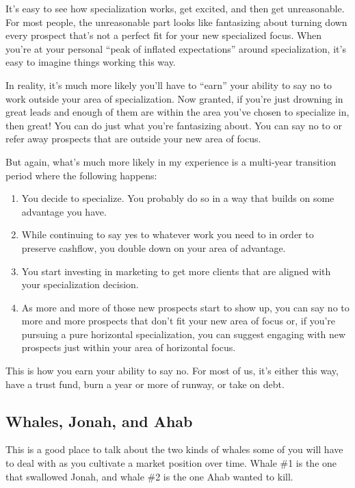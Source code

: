 It's easy to see how specialization works, get excited, and then get unreasonable. For most people, the unreasonable part looks like fantasizing about turning down every prospect that's not a perfect fit for your new specialized focus. When you're at your personal ``peak of inflated expectations'' around specialization, it's easy to imagine things working this way.

In reality, it's much more likely you'll have to ``earn'' your ability to say no to work outside your area of specialization. Now granted, if you're just drowning in great leads and enough of them are within the area you've chosen to specialize in, then great! You can do just what you're fantasizing about. You can say no to or refer away prospects that are outside your new area of focus.

But again, what's much more likely in my experience is a multi-year transition period where the following happens:

\begin{enumerate}
\item You decide to specialize. You probably do so in a way that builds on some advantage you have.
\item While continuing to say yes to whatever work you need to in order to preserve cashflow, you double down on your area of advantage.
\item You start investing in marketing to get more clients that are aligned with your specialization decision.
\item As more and more of those new prospects start to show up, you can say no to more and more prospects that don't fit your new area of focus or, if you're pursuing a pure horizontal specialization, you can suggest engaging with new prospects just within your area of horizontal focus.
\end{enumerate}

This is how you earn your ability to say no. For most of us, it's either this way, have a trust fund, burn a year or more of runway, or take on debt.

\subsection{Whales, Jonah, and Ahab}

This is a good place to talk about the two kinds of whales some of you will have to deal with as you cultivate a market position over time. Whale \#1 is the one that swallowed Jonah, and whale \#2 is the one Ahab wanted to kill.

